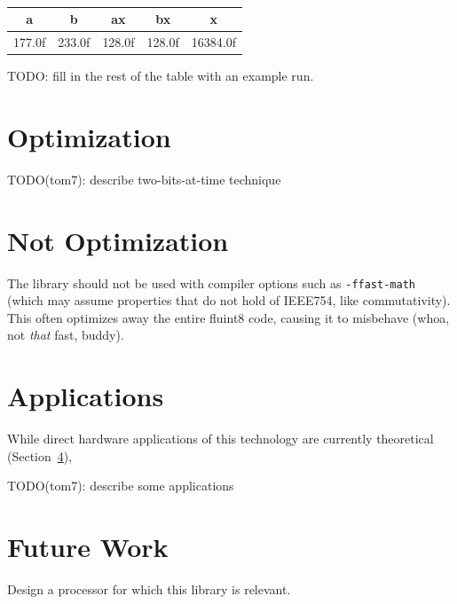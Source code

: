 \documentclass{acmsiggraph}
\theoremstyle{remark}
\theoremstyle{definition}
\begin{document}
{ \tt
\begin{tabular}{r|r|r|r|r}
\multicolumn{1}{c|}{a} &
\multicolumn{1}{c|}{b} &
\multicolumn{1}{c|}{ax} &
\multicolumn{1}{c|}{bx} &
\multicolumn{1}{c}{x} \\\hline
177.0f & 233.0f & 128.0f & 128.0f & 16384.0f \\
\end{tabular}
}

TODO: fill in the rest of the table with an example run.

\section{Optimization}

TODO(tom7): describe two-bits-at-time technique

\section{Not Optimization}

The library should not be used with compiler options such as
\verb+-ffast-math+ (which may assume properties that do not hold of
IEEE754, like commutativity). This often optimizes away the entire
fluint8 code, causing it to misbehave (whoa, not {\em that} fast,
buddy).

\section{Applications}

While direct hardware applications of this technology are currently
theoretical (Section~\ref{sec:future}), 

TODO(tom7): describe some applications

\section{Future Work} \label{sec:future}

Design a processor for which this library is relevant.
\end{document}
